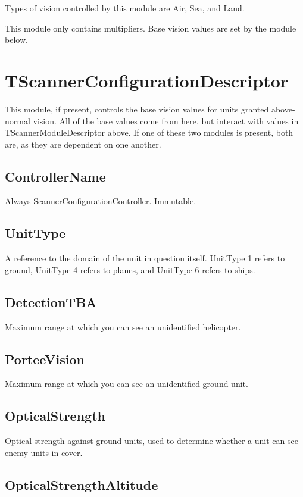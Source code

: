\documentclass{article}
\begin{document}
Types of vision controlled by this module are Air, Sea, and Land.

This module only contains multipliers. Base vision values are set by the module below.

\section{TScannerConfigurationDescriptor}

This module, if present, controls the base vision values for units granted above-normal vision. All of the base values come from here, but interact with values in TScannerModuleDescriptor above. If one of these two modules is present, both are, as they are dependent on one another.

\subsection{ControllerName}

Always ScannerConfigurationController. Immutable.

\subsection{UnitType}

A reference to the domain of the unit in question itself. UnitType 1 refers to ground, UnitType 4 refers to planes, and UnitType 6 refers to ships.

\subsection{DetectionTBA}

Maximum range at which you can see an unidentified helicopter.

\subsection{PorteeVision}

Maximum range at which you can see an unidentified ground unit.

\subsection{OpticalStrength}

Optical strength against ground units, used to determine whether a unit can see enemy units in cover.

\subsection{OpticalStrengthAltitude}
\end{document}
